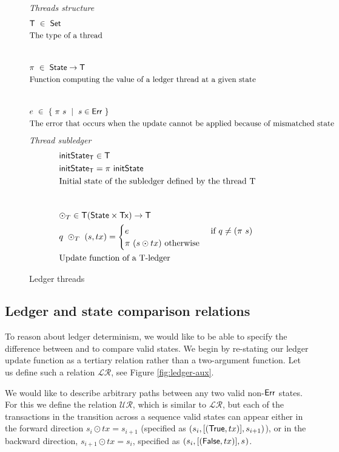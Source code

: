 \begin{figure*}[htb]
  \emph{Threads structure}
  \begin{align*}
    & \T ~\in~ \Set \\
    & \text{The type of a thread} \\
    \nextdef
    & \pi ~\in~ \State \to \T \\
    & \text{Function computing the value of a ledger thread at a given state} \\
    \nextdef
    & e ~\in~ \{~\pi~ s ~\mid~ s \in \Err~\} \\
    & \text{The error that occurs when the update cannot be applied because of mismatched state} \\
  \end{align*}
  \emph{Thread subledger}
  \begin{align*}
    & \fun{initState}_{\T} \in \T \\
    & \fun{initState}_{\T} = \pi ~\fun{initState} \\
    & \text{Initial state of the subledger defined by the thread T} \\
    \nextdef
    & \odot_T \in \T (\State \times \Tx) \to \T \\
    & q~\odot_T~(s, tx) = \begin{cases}
      e & \text{ if } q \neq (\pi~ s) \\
      \pi~(s \odot tx) \text{ otherwise}
    \end{cases} \\
    & \text{Update function of a T-ledger} \\
  \end{align*}
  \caption{Ledger threads}
  \label{fig:ledger-thread}
\end{figure*}

\pagebreak

\subsection{Ledger and state comparison relations}
\label{sec:relations}

To reason about ledger determinism, we would like to be able to specify the difference between
and to compare valid states. We begin by re-stating our ledger update function as
a tertiary relation rather than a two-argument function. Let us define
such a relation $\mathcal{LR}$, see Figure \ref{fig:ledger-aux}.

We would like to describe arbitrary paths between any two valid non-$\mathsf{Err}$ states.
For this we define the relation $\mathcal{UR}$, which is similar to $\mathcal{LR}$, but each
of the transactions in the transition across a sequence valid states can appear
either in the forward direction $s_i \odot tx = s_{i+1}$ (specified as $(s_i, [(\mathsf{True}, tx)], s_{i+1})$),
or in the backward direction, $s_{i+1} \odot tx = s_{i}$, specified as $(s_i, [(\mathsf{False}, tx)], s_{})$.

